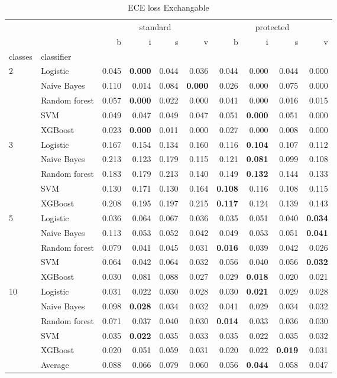 \begin{table}
\caption{ECE loss Exchangable}
\begin{tabular}{l|l|rrrr|rrrr}
\toprule
 &  & \multicolumn{4}{c}{standard} & \multicolumn{4}{c}{protected} \\
 &  & b & i & s & v & b & i & s & v \\
classes & classifier &  &  &  &  &  &  &  &  \\
\midrule
\midrule
\multirow[c]{5}{*}{2} & Logistic & 0.045 & \textbf{0.000} & 0.044 & 0.036 & 0.044 & 0.000 & 0.044 & 0.000 \\
 & Naive Bayes & 0.110 & 0.014 & 0.084 & \textbf{0.000} & 0.026 & 0.000 & 0.075 & 0.000 \\
 & Random forest & 0.057 & \textbf{0.000} & 0.022 & 0.000 & 0.041 & 0.000 & 0.016 & 0.015 \\
 & SVM & 0.049 & 0.047 & 0.049 & 0.047 & 0.051 & \textbf{0.000} & 0.051 & 0.000 \\
 & XGBoost & 0.023 & \textbf{0.000} & 0.011 & 0.000 & 0.027 & 0.000 & 0.008 & 0.000 \\
\midrule
\multirow[c]{5}{*}{3} & Logistic & 0.167 & 0.154 & 0.134 & 0.160 & 0.116 & \textbf{0.104} & 0.107 & 0.112 \\
 & Naive Bayes & 0.213 & 0.123 & 0.179 & 0.115 & 0.121 & \textbf{0.081} & 0.099 & 0.108 \\
 & Random forest & 0.183 & 0.179 & 0.213 & 0.140 & 0.149 & \textbf{0.132} & 0.144 & 0.133 \\
 & SVM & 0.130 & 0.171 & 0.130 & 0.164 & \textbf{0.108} & 0.116 & 0.108 & 0.115 \\
 & XGBoost & 0.208 & 0.195 & 0.197 & 0.215 & \textbf{0.117} & 0.124 & 0.139 & 0.143 \\
\midrule
\multirow[c]{5}{*}{5} & Logistic & 0.036 & 0.064 & 0.067 & 0.036 & 0.035 & 0.051 & 0.040 & \textbf{0.034} \\
 & Naive Bayes & 0.113 & 0.053 & 0.052 & 0.042 & 0.049 & 0.053 & 0.051 & \textbf{0.041} \\
 & Random forest & 0.079 & 0.041 & 0.045 & 0.031 & \textbf{0.016} & 0.039 & 0.042 & 0.026 \\
 & SVM & 0.064 & 0.042 & 0.064 & 0.032 & 0.056 & 0.040 & 0.056 & \textbf{0.032} \\
 & XGBoost & 0.030 & 0.081 & 0.088 & 0.027 & 0.029 & \textbf{0.018} & 0.020 & 0.021 \\
\midrule
\multirow[c]{5}{*}{10} & Logistic & 0.031 & 0.022 & 0.030 & 0.028 & 0.030 & \textbf{0.021} & 0.029 & 0.028 \\
 & Naive Bayes & 0.098 & \textbf{0.028} & 0.034 & 0.032 & 0.041 & 0.029 & 0.034 & 0.032 \\
 & Random forest & 0.071 & 0.037 & 0.040 & 0.030 & \textbf{0.014} & 0.033 & 0.036 & 0.030 \\
 & SVM & 0.035 & \textbf{0.022} & 0.035 & 0.033 & 0.035 & 0.022 & 0.035 & 0.032 \\
 & XGBoost & 0.020 & 0.051 & 0.059 & 0.031 & 0.020 & 0.022 & \textbf{0.019} & 0.031 \\\midrule\ & Average & 0.088 & 0.066 & 0.079 & 0.060 & 0.056 & \textbf{0.044} & 0.058 & 0.047 \\
\bottomrule
\end{tabular}
\end{table}
